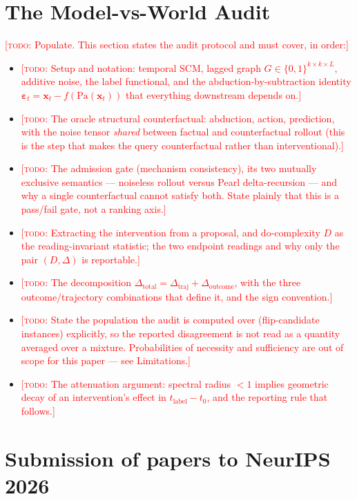 \documentclass{article}
\newcommand{\todo}[1]{\textcolor{red}{[\textsc{todo}: #1]}}
\newcommand{\bx}{\mathbf{x}}
\newcommand{\beps}{\boldsymbol{\varepsilon}}
\newcommand{\dototal}{\Delta_{\mathrm{total}}}
\newcommand{\dotraj}{\Delta_{\mathrm{traj}}}
\newcommand{\dooutcome}{\Delta_{\mathrm{outcome}}}
\newcommand{\Pa}{\mathrm{Pa}}
\begin{document}
\section{The Model-vs-World Audit}
\label{sec:audit}


\todo{Populate. This section states the audit protocol and must cover, in
order:}
\begin{itemize}
  \item \todo{Setup and notation: temporal SCM, lagged graph
    $G \in \{0,1\}^{k\times k\times L}$, additive noise, the label functional,
    and the abduction-by-subtraction identity
    $\beps_t = \bx_t - f(\Pa(\bx_t))$ that everything downstream depends on.}
  \item \todo{The oracle structural counterfactual: abduction, action,
    prediction, with the noise tensor \emph{shared} between factual and
    counterfactual rollout (this is the step that makes the query
    counterfactual rather than interventional).}
  \item \todo{The admission gate (mechanism consistency), its two mutually
    exclusive semantics --- noiseless rollout versus Pearl delta-recursion ---
    and why a single counterfactual cannot satisfy both. State plainly that
    this is a pass/fail gate, not a ranking axis.}
  \item \todo{Extracting the intervention from a proposal, and do-complexity
    $D$ as the reading-invariant statistic; the two endpoint readings and why
    only the pair $(D, \Delta)$ is reportable.}
  \item \todo{The decomposition
    $\dototal = \dotraj + \dooutcome$, with the three outcome/trajectory
    combinations that define it, and the sign convention.}
  \item \todo{State the population the audit is computed over (flip-candidate
    instances) explicitly, so the reported disagreement is not read as a
    quantity averaged over a mixture. Probabilities of necessity and
    sufficiency are out of scope for this paper --- see Limitations.}
  \item \todo{The attenuation argument: spectral radius $<1$ implies geometric
    decay of an intervention's effect in $t_{\mathrm{label}} - t_0$, and the
    reporting rule that follows.}
\end{itemize}



\section{Submission of papers to NeurIPS 2026}
\end{document}
